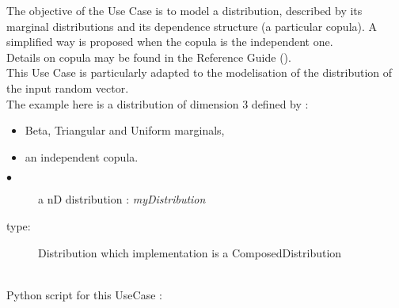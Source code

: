\renewcommand{\filename}{docUC_InputNoData_ComposedDistribution.tex}
\renewcommand{\filetitle}{UC : Creation  of nD distribution from (marginals, copula)}

\HeaderIIILevel







The objective of the Use Case is to model a distribution, described by its marginal distributions and its dependence structure (a particular copula). A simplified way is proposed when the copula is the independent one.\\

Details on copula may be found in the Reference Guide ().\\

This Use Case is particularly adapted to the modelisation of the distribution of the input random vector.\\

The example here is a distribution of dimension 3 defined by :
\begin{itemize}
\item Beta, Triangular and Uniform marginals,
\item an independent copula.
\end{itemize}

\noindent%
             {
               \begin{description}
               \item[$\bullet$] a nD distribution : {\itshape myDistribution}
               \item[type:] Distribution which implementation is a ComposedDistribution
               \end{description}
             }

             \textspace\\
             Python script for this UseCase :

